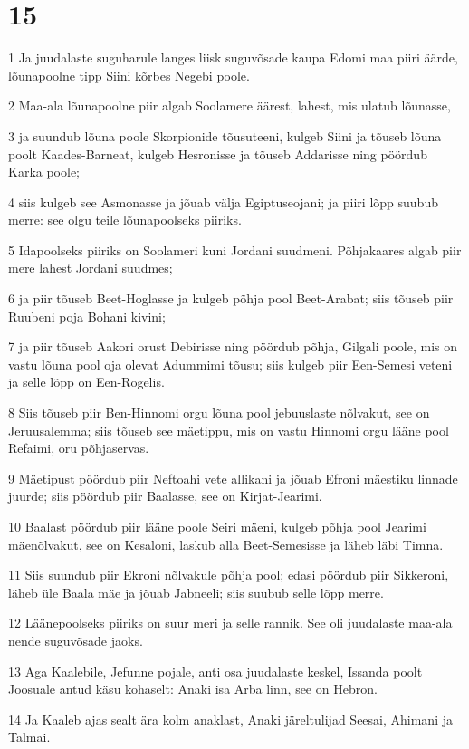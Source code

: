 \chapter{15}

\par 1 Ja juudalaste suguharule langes liisk suguvõsade kaupa Edomi maa piiri äärde, lõunapoolne tipp Siini kõrbes Negebi poole.
\par 2 Maa-ala lõunapoolne piir algab Soolamere äärest, lahest, mis ulatub lõunasse,
\par 3 ja suundub lõuna poole Skorpionide tõusuteeni, kulgeb Siini ja tõuseb lõuna poolt Kaades-Barneat, kulgeb Hesronisse ja tõuseb Addarisse ning pöördub Karka poole;
\par 4 siis kulgeb see Asmonasse ja jõuab välja Egiptuseojani; ja piiri lõpp suubub merre: see olgu teile lõunapoolseks piiriks.
\par 5 Idapoolseks piiriks on Soolameri kuni Jordani suudmeni. Põhjakaares algab piir mere lahest Jordani suudmes;
\par 6 ja piir tõuseb Beet-Hoglasse ja kulgeb põhja pool Beet-Arabat; siis tõuseb piir Ruubeni poja Bohani kivini;
\par 7 ja piir tõuseb Aakori orust Debirisse ning pöördub põhja, Gilgali poole, mis on vastu lõuna pool oja olevat Adummimi tõusu; siis kulgeb piir Een-Semesi veteni ja selle lõpp on Een-Rogelis.
\par 8 Siis tõuseb piir Ben-Hinnomi orgu lõuna pool jebuuslaste nõlvakut, see on Jeruusalemma; siis tõuseb see mäetippu, mis on vastu Hinnomi orgu lääne pool Refaimi, oru põhjaservas.
\par 9 Mäetipust pöördub piir Neftoahi vete allikani ja jõuab Efroni mäestiku linnade juurde; siis pöördub piir Baalasse, see on Kirjat-Jearimi.
\par 10 Baalast pöördub piir lääne poole Seiri mäeni, kulgeb põhja pool Jearimi mäenõlvakut, see on Kesaloni, laskub alla Beet-Semesisse ja läheb läbi Timna.
\par 11 Siis suundub piir Ekroni nõlvakule põhja pool; edasi pöördub piir Sikkeroni, läheb üle Baala mäe ja jõuab Jabneeli; siis suubub selle lõpp merre.
\par 12 Läänepoolseks piiriks on suur meri ja selle rannik. See oli juudalaste maa-ala nende suguvõsade jaoks.
\par 13 Aga Kaalebile, Jefunne pojale, anti osa juudalaste keskel, Issanda poolt Joosuale antud käsu kohaselt: Anaki isa Arba linn, see on Hebron.
\par 14 Ja Kaaleb ajas sealt ära kolm anaklast, Anaki järeltulijad Seesai, Ahimani ja Talmai.
